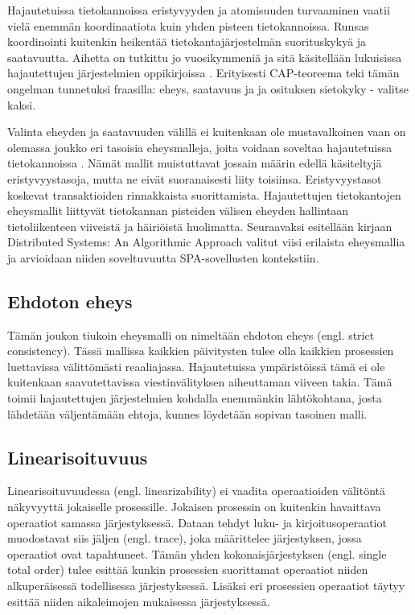 \documentclass[finnish,twoside,censored,csm,sw-track-2018]{HYthesisML}
\begin{document}
Hajautetuissa tietokannoissa eristyvyyden ja atomisuuden turvaaminen vaatii vielä enemmän koordinaatiota kuin yhden pisteen tietokannoissa. Runsas koordinointi kuitenkin heikentää tietokantajärjestelmän suorituskykyä ja saatavuutta. Aihetta on tutkittu jo vuosikymmeniä \citep{lamport} ja sitä käsitellään lukuisissa hajautettujen järjestelmien oppikirjoissa \citep{DSAA, DSC, Tanenbaum}. Erityisesti CAP-teoreema teki tämän ongelman tunnetuksi fraasilla: eheys, saatavuus ja ja osituksen sietokyky - valitse kaksi.

Valinta eheyden ja saatavuuden välillä ei kuitenkaan ole mustavalkoinen vaan on olemassa joukko eri tasoisia eheysmalleja, joita voidaan soveltaa hajautetuissa tietokannoissa \citep{cap-critique}. Nämät mallit muistuttavat jossain määrin edellä käsiteltyjä eristyvyystasoja, mutta ne eivät suoranaisesti liity toisiinsa. Eristyvyystasot koskevat transaktioiden rinnakkaista suorittamista. Hajautettujen tietokantojen eheysmallit liittyvät tietokannan pisteiden välisen eheyden hallintaan tietoliikenteen viiveistä ja häiriöistä huolimatta. Seuraavaksi esitellään kirjaan Distributed Systems: An Algorithmic Approach \citep{DSAA} valitut viisi erilaista eheysmallia ja arvioidaan niiden soveltuvuutta SPA-sovellusten kontekstiin. 

\subsection{Ehdoton eheys}

Tämän joukon tiukoin eheysmalli on nimeltään ehdoton eheys \citep{DSAA} (engl. strict consistency). Tässä mallissa kaikkien päivitysten tulee olla kaikkien prosessien luettavissa välittömästi reaaliajassa. Hajautetuissa ympäristöissä tämä ei ole kuitenkaan saavutettavissa viestinvälityksen aiheuttaman viiveen takia. Tämä toimii hajautettujen järjestelmien kohdalla enemmänkin lähtökohtana, josta lähdetään väljentämään ehtoja, kunnes löydetään sopivan tasoinen malli.

\subsection{Linearisoituvuus}

Linearisoituvuudessa \citep{linearizability} (engl. linearizability) ei vaadita operaatioiden välitöntä näkyvyyttä jokaiselle prosessille. Jokaisen prosessin on kuitenkin havaittava operaatiot samassa järjestyksessä. Dataan tehdyt luku- ja kirjoitusoperaatiot muodostavat siis jäljen (engl. trace), joka määrittelee järjestyksen, jossa operaatiot ovat tapahtuneet. Tämän yhden kokonaisjärjestyksen (engl. single total order) tulee esittää kunkin prosessien suorittamat operaatiot niiden alkuperäisessä todellisessa järjestyksessä. Lisäksi eri prosessien operaatiot täytyy esittää niiden aikaleimojen mukaisessa järjestyksessä.
\end{document}
